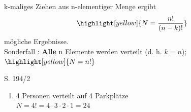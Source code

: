 \begin{note}
\begin{enumerate}[leftmargin=*]
{        \begin{Corollary}{}{}
            k-maliges Ziehen aus n-elementiger Menge ergibt 
            \begin{equation*}
                \highlight[yellow]{N = \dfrac{n!}{(n - k)!}} 
            \end{equation*}
            mögliche Ergebnisse.\\[1.0ex]
            Sonderfall : \textbf{Alle} n Elemente werden verteilt (d. h. $k = n$); \quad $\highlight[yellow]{N = n!}$
        \end{Corollary}
        }
\end{enumerate}
\end{note}

\begin{Exercise}{S. 194/2}{}
\begin{enumerate}[leftmargin=*]
    \item [2.]{
        4 Personen verteilt auf 4 Parkplätze\\[1.0ex]
        $N = 4! = 4 \cdot 3 \cdot 2 \cdot 1 = 24$
    }
\end{enumerate}
\end{Exercise}

